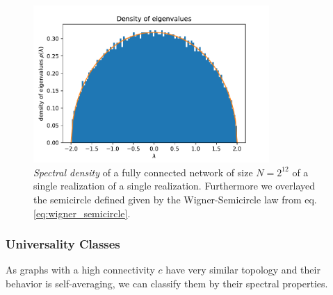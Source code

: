 \documentclass[../main.tex]{subfiles}
\begin{document}
\begin{figure}[htpb]
    \centering
    \includegraphics[width=0.8\textwidth]{../figures/2_1_3_wigner_semicircle.pdf}
    \caption{
        \emph{Spectral density} of a fully connected network of size $N= 2^{12}$ of a single realization of a single realization.
        Furthermore we overlayed the semicircle defined given by the Wigner-Semicircle law from eq. \eqref{eq:wigner_semicircle}.
    }
    \label{fig:wigner_semicircle}
\end{figure}

\subsubsection{Universality Classes}
As graphs with a high connectivity $c$ have very similar topology and their behavior is self-averaging, we can classify them by their spectral properties.
\end{document}
